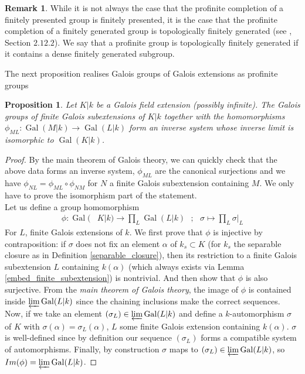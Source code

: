 \documentclass{article}
\theoremstyle{plain}
\newtheorem{proposition}[theorem]{Proposition}
\theoremstyle{definition}
\newtheorem{remark}{Remark}
\DeclareMathOperator{\Gal}{Gal}
\begin{document}
\begin{remark}
\label{finite_generated_prof_grp}
While it is not always the case that the profinite completion of a finitely presented group is finitely presented, 
it is the case that the profinite completion of a finitely generated group is topologically finitely generated (see \cite{Ribes}, Section $2.12.2$).
We say that a profinite group is topologically finitely generated if it contains a
dense finitely generated subgroup.
\end{remark}


\noindent The next proposition realises Galois groups of Galois extensions as profinite groups

\begin{proposition}
\label{Galois_groups_are_profinite}
    Let $K|k$ be a Galois field extension (possibly infinite). The Galois groups of finite Galois subextensions of $K|k$ together with the homomorphisms $\phi_{ML}:\Gal(M|k)\rightarrow \Gal(L|k)$ form an inverse system whose inverse limit is isomorphic to $\Gal(K|k)$.
\end{proposition}
\begin{proof}
    By the main theorem of Galois theory, we can quickly check that the above data forms an inverse system, $\phi_{ML}$ are the canonical surjections and we have $\phi_{NL}=\phi_{ML}\circ\phi_{NM}$ for $N$ a finite Galois subextension containing $M$. We only have to prove the isomorphism part of the statement.\\
    Let us define a group homomorphism 
    \begin{equation*}
        \begin{split}
            \phi : \Gal(&K|k)\longrightarrow \prod_{L}  \Gal(L|k)\textbf{ } ; \textbf{ }
            \sigma \longmapsto \prod_{L} \sigma\vert_L
        \end{split}
    \end{equation*}
    For $L$, finite Galois extensions of $k$.
    We first prove that $\phi$ is injective by contraposition: if $\sigma$ does not fix an element $\alpha$ of $k_s\subset K$ (for $k_s$ the separable closure as in Definition \ref{separable_closure}), then its restriction to a finite Galois subextension $L$ containing $k(\alpha)$  (which always exists via Lemma \ref{embed_finite_subextension}) is nontrivial.
    And then show that $\phi$ is also surjective. 
    From the \textit{main theorem of Galois theory}, the image of $\phi$ is contained inside $\varprojlim \Gal(L|k)$ since the chaining inclusions make the correct sequences. 
    Now, if we take an element $(\sigma_L)\in \varprojlim \Gal(L|k)$ and define a $k$-automorphism $\sigma$ of $K$ with $\sigma(\alpha) = \sigma_L(\alpha)$, $L$ some finite Galois extension containing $k(\alpha)$. $\sigma$ is well-defined since by definition our sequence $(\sigma_L)$ forms a compatible system of automorphisms. Finally, by construction $\sigma$ maps to $(\sigma_L)\in \varprojlim \Gal(L|k)$, so $Im (\phi) = \varprojlim \Gal(L|k)$.
\end{proof}
\end{document}
